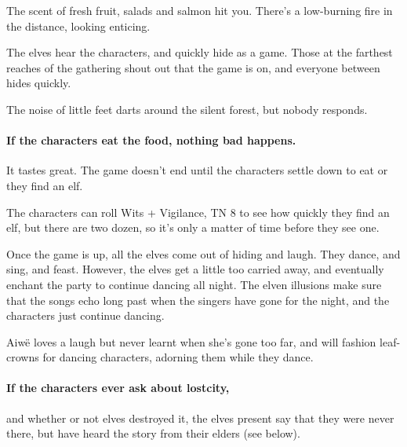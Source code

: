 \begin{multicols}{2}
\begin{boxtext}
	The scent of fresh fruit, salads and salmon hit you.  There's a low-burning fire in the distance, looking enticing.

\end{boxtext}

The elves hear the characters, and quickly hide as a game.  Those at the farthest reaches of the gathering shout out that the game is on, and everyone between hides quickly.

\begin{boxtext}

	The noise of little feet darts around the silent forest, but nobody responds.

\end{boxtext}

\paragraph{If the characters eat the food, nothing bad happens.}
It tastes great.
The game doesn't end until the characters settle down to eat or they find an elf.

The characters can roll Wits + Vigilance, TN 8 to see how quickly they find an elf, but there are two dozen, so it's only a matter of time before they see one.

Once the game is up, all the elves come out of hiding and laugh.  They dance, and sing, and feast.  However, the elves get a little too carried away, and eventually enchant the party to continue dancing all night.  The elven illusions make sure that the songs echo long past when the singers have gone for the night, and the characters just continue dancing.
 

Aiw\"{e} loves a laugh but never learnt when she's gone too far, and will fashion leaf-crowns for dancing characters, adorning them while they dance.



\paragraph{If the characters ever ask about \gls{lostcity},}
and whether or not elves destroyed it, the elves present say that they were never there, but have heard the story from their elders (see below).


\end{multicols}
